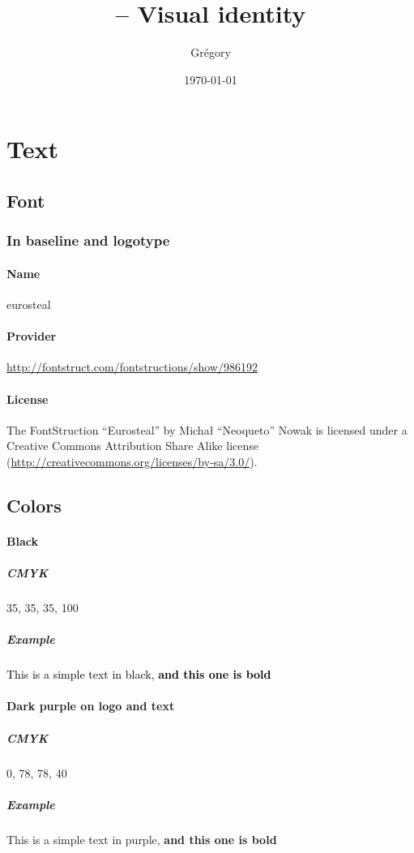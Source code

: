 \documentclass[a4paper,oneside]{article}
\author{Grégory \bsc{David}}
\title{\vilain{} -- Visual identity}
\date{\today{}}
\begin{document}
\maketitle{}
\tableofcontents{}

\section{Text}
\subsection{Font}
\subsubsection{In baseline and logotype}
\paragraph{Name} eurosteal
\paragraph{Provider}
\url{http://fontstruct.com/fontstructions/show/986192}
\paragraph{License} The FontStruction “Eurosteal” by Michał “Neoqueto”
Nowak is licensed under a Creative Commons Attribution Share Alike
license (\url{http://creativecommons.org/licenses/by-sa/3.0/}).

\subsection{Colors}
\paragraph{Black}
\subparagraph{CMYK} 35, 35, 35, 100

\subparagraph{Example} \textcolor{black}{This is a simple text in
  black, \textbf{and this one is bold}}

\paragraph{Dark purple on logo and text}
\subparagraph{CMYK} 0, 78, 78, 40

\subparagraph{Example} \textcolor{vilainRed}{This is a simple text in
  purple, \textbf{and this one is bold}}
\end{document}
